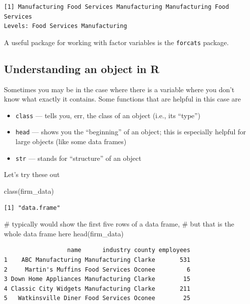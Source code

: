 \documentclass[
  letterpaper,
  DIV=11,
  numbers=noendperiod]{scrreprt}
\newenvironment{Shaded}{\begin{snugshade}}{\end{snugshade}}
\newcommand{\CommentTok}[1]{\textcolor[rgb]{0.37,0.37,0.37}{#1}}
\newcommand{\FunctionTok}[1]{\textcolor[rgb]{0.28,0.35,0.67}{#1}}
\newcommand{\NormalTok}[1]{\textcolor[rgb]{0.00,0.23,0.31}{#1}}
\begin{document}
\begin{verbatim}
[1] Manufacturing Food Services Manufacturing Manufacturing Food Services
Levels: Food Services Manufacturing
\end{verbatim}

A useful package for working with factor variables is the
\texttt{forcats} package.

\subsection{Understanding an object in
R}\label{understanding-an-object-in-r}

Sometimes you may be in the case where there is a variable where you
don't know what exactly it contains. Some functions that are helpful in
this case are

\begin{itemize}
\item
  \texttt{class} --- tells you, err, the class of an object (i.e., its
  ``type'')
\item
  \texttt{head} --- shows you the ``beginning'' of an object; this is
  especially helpful for large objects (like some data frames)
\item
  \texttt{str} --- stands for ``structure'' of an object
\end{itemize}

Let's try these out

\begin{Shaded}
\begin{Highlighting}[]
\FunctionTok{class}\NormalTok{(firm\_data)}
\end{Highlighting}
\end{Shaded}

\begin{verbatim}
[1] "data.frame"
\end{verbatim}

\begin{Shaded}
\begin{Highlighting}[]
\CommentTok{\# typically would show the first five rows of a data frame,}
\CommentTok{\# but that is the whole data frame here}
\FunctionTok{head}\NormalTok{(firm\_data) }
\end{Highlighting}
\end{Shaded}

\begin{verbatim}
                  name      industry county employees
1    ABC Manufacturing Manufacturing Clarke       531
2     Martin's Muffins Food Services Oconee         6
3 Down Home Appliances Manufacturing Clarke        15
4 Classic City Widgets Manufacturing Clarke       211
5   Watkinsville Diner Food Services Oconee        25
\end{verbatim}
\end{document}
